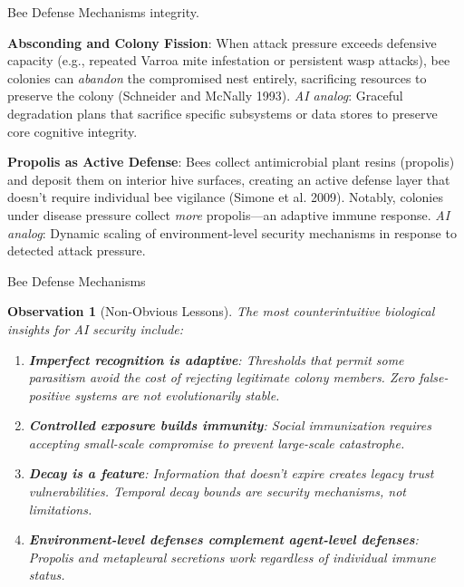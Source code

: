 \documentclass[
  ignorenonframetext,
]{beamer}
\newtheorem{observation}{Observation}
\begin{document}
\begin{frame}[allowframebreaks]{Bee Defense Mechanisms}
integrity.

\textbf{Absconding and Colony Fission}: When attack pressure exceeds
defensive capacity (e.g., repeated Varroa mite infestation or persistent
wasp attacks), bee colonies can \emph{abandon} the compromised nest
entirely, sacrificing resources to preserve the colony (Schneider and
McNally 1993). \emph{AI analog}: Graceful degradation plans that
sacrifice specific subsystems or data stores to preserve core cognitive
integrity.

\textbf{Propolis as Active Defense}: Bees collect antimicrobial plant
resins (propolis) and deposit them on interior hive surfaces, creating
an active defense layer that doesn't require individual bee vigilance
(Simone et al. 2009). Notably, colonies under disease pressure collect
\emph{more} propolis---an adaptive immune response. \emph{AI analog}:
Dynamic scaling of environment-level security mechanisms in response to
detected attack pressure.

\end{frame}

\begin{frame}[allowframebreaks]{Bee Defense Mechanisms}
\begin{observation}[Non-Obvious Lessons]
\label{obs:non-obvious}
The most counterintuitive biological insights for AI security include:
\begin{enumerate}
\item \textbf{Imperfect recognition is adaptive}: Thresholds that permit some parasitism avoid the cost of rejecting legitimate colony members. Zero false-positive systems are not evolutionarily stable.
\item \textbf{Controlled exposure builds immunity}: Social immunization requires accepting small-scale compromise to prevent large-scale catastrophe.
\item \textbf{Decay is a feature}: Information that doesn't expire creates legacy trust vulnerabilities. Temporal decay bounds are security mechanisms, not limitations.
\item \textbf{Environment-level defenses complement agent-level defenses}: Propolis and metapleural secretions work regardless of individual immune status.
\end{enumerate}
\end{observation}
\end{frame}

\begin{frame}
\end{frame}
\end{document}
